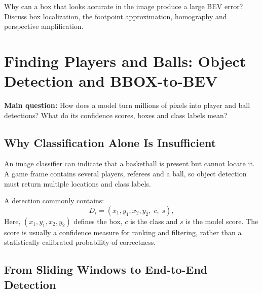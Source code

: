 \documentclass[11pt,a4paper,oneside]{report}
\begin{document}
\begin{questionBox}
Why can a box that looks accurate in the image produce a large BEV error? Discuss box localization, the footpoint approximation, homography and perspective amplification.
\end{questionBox}

\chapter{Finding Players and Balls: Object Detection and BBOX-to-BEV}

\begin{heroBox}
\textbf{Main question:}\quad
How does a model turn millions of pixels into player and ball detections? What do its confidence scores, boxes and class labels mean?
\end{heroBox}

\section{Why Classification Alone Is Insufficient}

\begin{conceptBox}
An image classifier can indicate that a basketball is present but cannot locate it. A game frame contains several players, referees and a ball, so object detection must return multiple locations and class labels.
\end{conceptBox}

A detection commonly contains:
\[
D_i=(x_1,y_1,x_2,y_2,\;c,\;s),
\]
Here, $(x_1,y_1,x_2,y_2)$ defines the box, $c$ is the class and $s$ is the model score. The score is usually a confidence measure for ranking and filtering, rather than a statistically calibrated probability of correctness.

\section{From Sliding Windows to End-to-End Detection}
\end{document}
